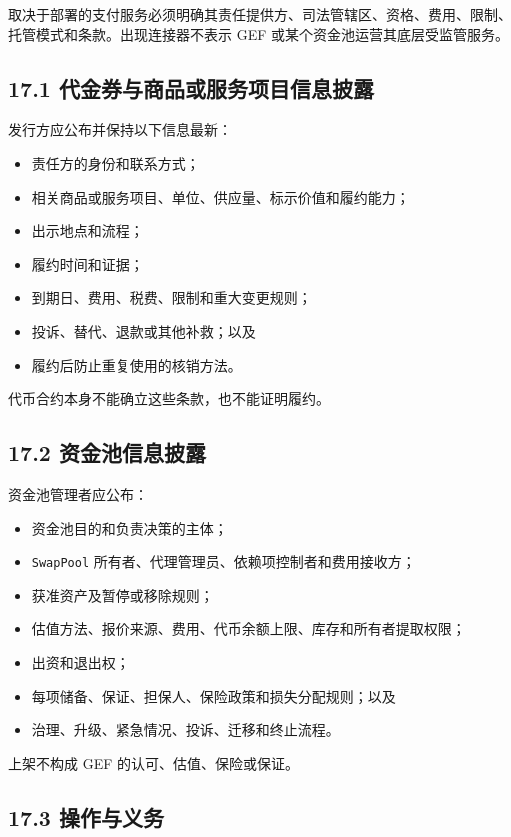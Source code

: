 \documentclass[11pt]{article}
\begin{document}
取决于部署的支付服务必须明确其责任提供方、司法管辖区、资格、费用、限制、托管模式和条款。出现连接器不表示 GEF 或某个资金池运营其底层受监管服务。

\subsection*{17.1 代金券与商品或服务项目信息披露}

发行方应公布并保持以下信息最新：

\begin{itemize}[leftmargin=*]
\item 责任方的身份和联系方式；
\item 相关商品或服务项目、单位、供应量、标示价值和履约能力；
\item 出示地点和流程；
\item 履约时间和证据；
\item 到期日、费用、税费、限制和重大变更规则；
\item 投诉、替代、退款或其他补救；以及
\item 履约后防止重复使用的核销方法。
\end{itemize}
代币合约本身不能确立这些条款，也不能证明履约。

\subsection*{17.2 资金池信息披露}

资金池管理者应公布：

\begin{itemize}[leftmargin=*]
\item 资金池目的和负责决策的主体；
\item \texttt{SwapPool} 所有者、代理管理员、依赖项控制者和费用接收方；
\item 获准资产及暂停或移除规则；
\item 估值方法、报价来源、费用、代币余额上限、库存和所有者提取权限；
\item 出资和退出权；
\item 每项储备、保证、担保人、保险政策和损失分配规则；以及
\item 治理、升级、紧急情况、投诉、迁移和终止流程。
\end{itemize}
上架不构成 GEF 的认可、估值、保险或保证。

\subsection*{17.3 操作与义务}
\end{document}
